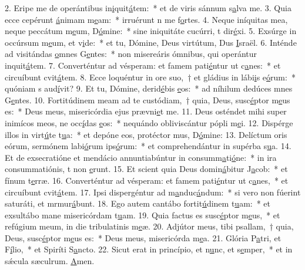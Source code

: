 2. Eripe me de operántibus in\uline{i}quit\uline{á}tem:~* et de viris sánnum s\uline{a}lva me.
3. Quia ecce cepérunt \uline{á}nimam m\uline{e}am:~* irruérunt n me f\uline{o}rtes.
4. Neque iníquitas mea, neque peccátum m\uline{e}um, D\uline{ó}mine:~* sine iniquitáte cucúrri, t dir\uline{é}xi.
5. Exsúrge in occúrsum m\uline{e}um, et v\uline{i}de:~* et tu, Dómine, Deus virtútum, Dus \uline{I}sraël.
6. Inténde ad visitándas \uline{o}mnes G\uline{e}ntes:~* non misereáris ómnibus, qui operántur inquit\uline{á}tem.
7. Converténtur ad vésperam: et famem pati\uline{é}ntur ut c\uline{a}nes:~* et circuíbunt cvit\uline{á}tem.
8. Ecce loquéntur in ore suo,~† et gládius in lábi\uline{i}s e\uline{ó}rum:~* quóniam s aud\uline{í}vit?
9. Et tu, Dómine, derid\uline{é}bis \uline{e}os:~* ad níhilum dedúces mnes G\uline{e}ntes.
10. Fortitúdinem meam ad te custódiam,~† quia, Deus, susc\uline{é}ptor m\uline{e}us es:~* Deus meus, misericórdia ejus prævni\uline{e}t me.
11. Deus osténdet mihi super inimícos meos, ne occ\uline{í}das \uline{e}os:~* nequándo obliviscántur pópli m\uline{e}i.
12. Dispérge illos in virt\uline{ú}te t\uline{u}a:~* et depóne eos, protéctor mus, D\uline{ó}mine:
13. Delíctum oris eórum, sermónem labi\uline{ó}rum ips\uline{ó}rum:~* et comprehendántur in supérba s\uline{u}a.
14. Et de exsecratióne et mendácio annuntiabúntur in consumm\uline{a}ti\uline{ó}ne:~* in ira consummatiónis, t non \uline{e}runt.
15. Et scient quia Deus domin\uline{á}bitur J\uline{a}cob:~* et fínum t\uline{e}rræ.
16. Converténtur ad vésperam: et famem pati\uline{é}ntur ut c\uline{a}nes,~* et circuíbunt cvit\uline{á}tem.
17. Ipsi dispergéntur ad m\uline{a}nduc\uline{á}ndum:~* si vero non fúerint saturáti, et mrmur\uline{á}bunt.
18. Ego autem cantábo fortit\uline{ú}dinem t\uline{u}am:~* et exsultábo mane misericórdam t\uline{u}am.
19. Quia factus es susc\uline{é}ptor m\uline{e}us,~* et refúgium meum, in die tribulatinis m\uline{e}æ.
20. Adjútor meus, tibi psallam,~† quia, Deus, susc\uline{é}ptor m\uline{e}us es:~* Deus meus, misericórda m\uline{e}a.
21. Glória P\uline{a}tri, et F\uline{í}lio,~* et Spiríti S\uline{a}ncto.
22. Sicut erat in princípio, et n\uline{u}nc, et s\uline{e}mper,~* et in sǽcula sæculrum. \uline{A}men.
